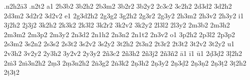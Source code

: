 %
%
.n2h2ā3
.n2t2
a1
2b3b2
3b2h2
2b3m2
3b2r2
3b2y2
2c3c2
3c2h2
2d3d2
3d2h2
2d3m2
3d2r2
3d2v2
e1
2g3d2h2
2g3g2
3g2h2
2g3r2
2g3y2
2h3m2
2h3v2
2h3y2
i1
3j2h2
2j3j2
3k2h2
2k3k2
2k3l2
3k2r2
3k2v2
3k2y2
2l3l2
2l3y2
2m3b2
2m3h2
2m3m2
2m3p2
2m3y2
2n3d2
2n1h2
2n3n2
2n1t2
2n3v2
o1
3p2h2
2p3l2
2p3p2
2s3m2
3s2n2
2s3s2
2s3t2
3s2v2
3s2y2
3t2h2
2t3n2
2t3r2
2t3t2
3t2v2
3t2y2
u1
2v3h2
3v2y2
2y3h2
3y2v2
2y3y2
2ñ3c2
2ñ3h2
2ñ3j2
2ñ3ñ2
ā1
ī1
ū1
2ḍ3ḍ2
3ḷ2h2
2ṁ3
2ṁ3n2h2
2ṃ3
2ṃ3n2h2
2ṅ3g2
2ṅ3k2
2ṇ3h2
2ṇ3y2
2ṇ3ḍ2
2ṇ3ṇ2
2ṇ3ṭ2
3ṭ2h2
2ṭ3ṭ2
